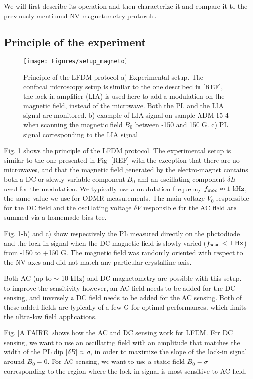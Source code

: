 \documentclass[a4paper,11pt]{report}
\begin{document}
We will first describe its operation and then characterize it and compare it to the previously mentioned NV magnetometry protocols.

\subsection{Principle of the experiment}

\begin{figure}[h!]
\centering
\texttt{[image: Figures/setup\_magneto]}
\caption{Principle of the LFDM protocol a) Experimental setup. The confocal microscopy setup is similar to the one described in [REF], the lock-in amplifier (LIA) is used here to add a modulation on the magnetic field, instead of the microwave. Both the PL and the LIA signal are monitored. b) example of LIA signal on sample ADM-15-4 when scanning the magnetic field $B_0$ between -150 and 150 G. c) PL signal corresponding to the LIA signal}
\label{setup magneto}
\end{figure}

Fig. \ref{setup magneto} shows the principle of the LFDM protocol. The experimental setup is similar to the one presented in Fig. [REF] with the exception that there are no microwaves, and that the magnetic field generated by the electro-magnet contains both a DC or slowly variable component $B_0$ and an oscillating component $\delta B$ used for the modulation. We typically use a modulation frequency $f_{\rm mod} \approx 1\ \rm kHz$, the same value we use for ODMR measurements. The main voltage $V_0$ responsible for the DC field and the oscillating voltage $\delta V$ responsible for the AC field are summed via a homemade bias tee.

Fig. \ref{setup magneto}-b) and c) show respectively the PL measured directly on the photodiode and the lock-in signal when the DC magnetic field is slowly varied ($f_{\rm scan}<1\ \rm Hz$) from -150 to +150 G. The magnetic field was randomly oriented with respect to the NV axes and did not match any particular crystalline axis.

Both AC (up to $\sim$ 10 kHz) and DC-magnetometry are possible with this setup. to improve the sensitivity however, an AC field needs to be added for the DC sensing, and inversely a DC field needs to be added for the AC sensing. Both of these added fields are typically of a few G for optimal performances, which limits the ultra-low field applications.

Fig. [A FAIRE] shows how the AC and DC sensing work for LFDM. For DC sensing, we want to use an oscillating field with an amplitude that matches the width of the PL dip $|\delta B| \approx \sigma$, in order to maximize the slope of the lock-in signal around $B_0=0$. For AC sensing, we want to use a static field $B_0=\sigma$ corresponding to the region where the lock-in signal is most sensitive to AC field. 
\end{document}
